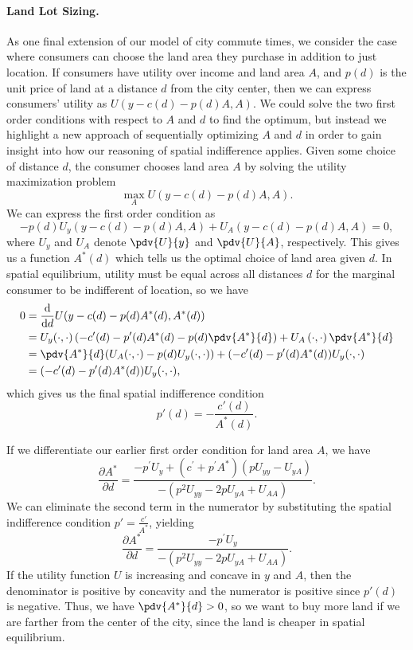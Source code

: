 \paragraph{Land Lot Sizing.} As one final extension of our model of city commute times, we consider the case where consumers can choose the land area they purchase in addition to just location. If consumers have utility over income and land area $A$, and $p(d)$ is the unit price of land at a distance $d$ from the city center, then we can express consumers' utility as $U(y-c(d)-p(d)A, A).$ We could solve the two first order conditions with respect to $A$ and $d$ to find the optimum, but instead we highlight a new approach of sequentially optimizing $A$ and $d$ in order to gain insight into how our reasoning of spatial indifference applies. Given some choice of distance $d$, the consumer chooses land area $A$ by solving the utility maximization problem 
$$\max_{A}U(y-c(d)-p(d)A, A).$$
We can express the first order condition as 
$$-p(d)U_y(y-c(d)-p(d)A, A) + U_A(y-c(d)-p(d)A, A) = 0,$$
where $U_y$ and $U_A$ denote $\pdv{U}{y}$ and $\pdv{U}{A}$, respectively. This gives us a function $A^*(d)$ which tells us the optimal choice of land area given $d$. In spatial equilibrium, utility must be equal across all distances $d$ for the marginal consumer to be indifferent of location, so we have
\begin{align*}
    0 &= \frac{\text{d}}{\text{d}d} U(y - c(d) - p(d)A^*(d), A^*(d)) \\
    &= U_y(\cdot, \cdot)\left(-c'(d)-p'(d)A^*(d) - p(d)\pdv{A^*}{d}\right) + U_A\left(\cdot, \cdot\right)\pdv{A^*}{d} \\
    &= \pdv{A^*}{d}(U_A(\cdot, \cdot) - p(d)U_y(\cdot, \cdot)) + (-c'(d)-p'(d)A^*(d))U_y(\cdot, \cdot) \\
    &= (-c'(d)-p'(d)A^*(d))U_y(\cdot, \cdot),
\end{align*}
which gives us the final spatial indifference condition
$$p'(d) = -\frac{c'(d)}{A^*(d)}.$$

If we differentiate our earlier first order condition for land area $A$, we have
$$\frac{\partial A^{*}}{\partial d}=\frac{-p^{\prime} U_{y}+\left(c^{\prime}+p^{\prime} A^{*}\right)\left(p U_{yy}-U_{yA}\right)}{-\left(p^{2} U_{yy}-2 p U_{yA}+U_{AA}\right)}.$$
We can eliminate the second term in the numerator by substituting the spatial indifference condition $p' = \frac{c'}{A^*}$, yielding
$$\frac{\partial A^{*}}{\partial d}=\frac{-p^{\prime} U_{y}}{-\left(p^{2} U_{yy}-2 p U_{yA}+U_{AA}\right)}.$$
If the utility function $U$ is increasing and concave in $y$ and $A$, then the denominator is positive by concavity and the numerator is positive since $p'(d)$ is negative. Thus, we have $\pdv{A^*}{d} > 0$, so we want to buy more land if we are farther from the center of the city, since the land is cheaper in spatial equilibrium. 

